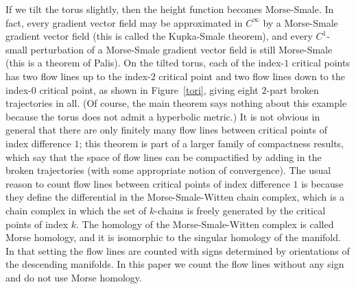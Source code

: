\documentclass[psamsfonts]{amsart}
\theoremstyle{remark}
\begin{document}
If we tilt the torus slightly, then the height function becomes Morse-Smale.  In fact, every gradient vector field may be approximated in $C^\infty$ by a Morse-Smale gradient vector field (this is called the Kupka-Smale theorem), and every $C^1$-small perturbation of a Morse-Smale gradient vector field is still Morse-Smale (this is a theorem of Palis).  On the tilted torus, each of the index-$1$ critical points has two flow lines up to the index-$2$ critical point and two flow lines down to the index-$0$ critical point, as shown in Figure~\ref{tori}, giving eight $2$-part broken trajectories in all.  (Of course, the main theorem says nothing about this example because the torus does not admit a hyperbolic metric.)  It is not obvious in general that there are only finitely many flow lines between critical points of index difference $1$; this theorem is part of a larger family of compactness results, which say that the space of flow lines can be compactified by adding in the broken trajectories (with some appropriate notion of convergence).  The usual reason to count flow lines between critical points of index difference $1$ is because they define the differential in the Morse-Smale-Witten chain complex, which is a chain complex in which the set of $k$-chains is freely generated by the critical points of index $k$.  The homology of the Morse-Smale-Witten complex is called Morse homology, and it is isomorphic to the singular homology of the manifold.  In that setting the flow lines are counted with signs determined by orientations of the descending manifolds.  In this paper we count the flow lines without any sign and do not use Morse homology.
\end{document}
